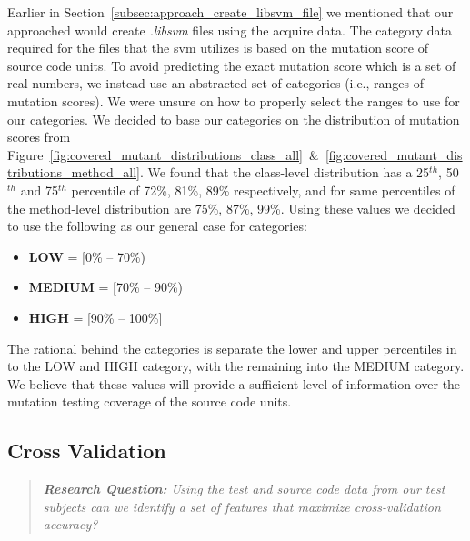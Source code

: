 Earlier in Section~\ref{subsec:approach_create_libsvm_file} we mentioned that our approached would create \emph{.libsvm} files using the acquire data. The category data required for the files that the \gls{svm} utilizes is based on the mutation score of source code units. To avoid predicting the exact mutation score which is a set of real numbers, we instead use an abstracted set of categories (i.e., ranges of mutation scores). We were unsure on how to properly select the ranges to use for our categories. We decided to base our categories on the distribution of mutation scores from Figure~\ref{fig:covered_mutant_distributions_class_all}~\&~\ref{fig:covered_mutant_distributions_method_all}. We found that the class-level distribution has a 25$^{th}$, 50$^{th}$ and 75$^{th}$ percentile of 72\%, 81\%, 89\% respectively, and for same percentiles of the method-level distribution are 75\%, 87\%, 99\%. Using these values we decided to use the following as our general case for categories:

\begin{itemize}
  \item \textbf{LOW} = [0\% -- 70\%)
  \item \textbf{MEDIUM} = [70\% -- 90\%)
  \item \textbf{HIGH} = [90\% -- 100\%]
\end{itemize}

The rational behind the categories is separate the lower and upper percentiles in to the LOW and HIGH category, with the remaining into the MEDIUM category. We believe that these values will provide a sufficient level of information over the mutation testing coverage of the source code units.


\subsection{Cross Validation}
\label{subsec:experiment_cross_validation}
\begin{quote}
	\emph{\textbf{Research Question:} Using the test and source code data from our test subjects can we identify a set of features that maximize cross-validation accuracy?}
\end{quote}


